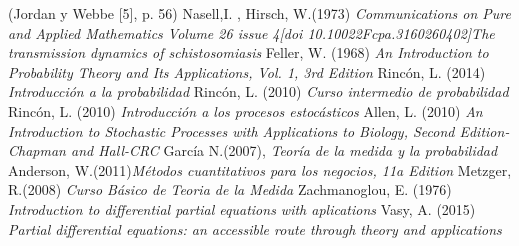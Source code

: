 \clearpage
{}
\begin{thebibliography}{25}
 (Jordan y Webbe [5], p.
56)
Nasell,I. , Hirsch, W.(1973)\emph{ Communications on Pure and Applied Mathematics Volume 26 issue 4[doi 10.10022Fcpa.3160260402]The transmission dynamics of schistosomiasis}
Feller, W. (1968)\emph{ An Introduction to Probability Theory and Its Applications, Vol. 1, 3rd Edition}
 Rincón, L. (2014) \emph{Introducción a la probabilidad}
 Rincón, L. (2010) \emph{Curso intermedio de probabilidad}
 Rincón, L. (2010) \emph{ Introducción a los procesos estocásticos}
 Allen, L. (2010)\emph{ An Introduction to Stochastic Processes with Applications to Biology, Second Edition-Chapman and Hall-CRC}
 García N.(2007), \emph{Teoría de la medida y la probabilidad}
 Anderson, W.(2011)\emph{Métodos cuantitativos para los negocios, 11a Edition}
 Metzger, R.(2008) \emph{Curso Básico de Teoria de la Medida}
 Zachmanoglou, E. (1976) \emph{Introduction to differential partial equations with aplications}
 Vasy, A. (2015) \emph{Partial differential equations: an accessible route through theory and applications}
\end{thebibliography}

